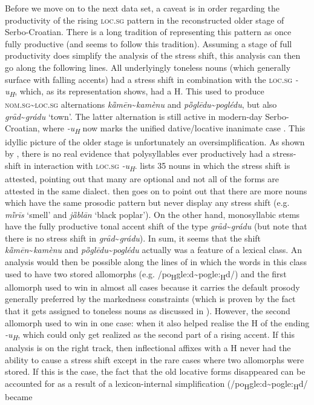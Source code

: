 \documentclass[output=paper,modfonts,nonflat
]{langsci/langscibook}
\begin{document}
Before we move on to the next data set, a caveat is in order regarding the productivity of the rising \textsc{loc}.\textsc{sg} pattern in the reconstructed older stage of Serbo-Croatian. There is a long tradition of representing this pattern as once fully productive (and \citeauthor{Klaic2013} seems to follow this tradition). Assuming a stage of full productivity does simplify the analysis of the stress shift, this analysis can then go along the following lines. All underlyingly toneless nouns (which generally surface with falling accents) had a stress shift in combination with the \textsc{loc}.\textsc{sg} \textit{-u\textsubscript{H}}, which, as its representation shows, had a H. This used to produce \textsc{nom}.\textsc{sg}\textasciitilde{}\textsc{loc}.\textsc{sg} alternations \textit{kȁmēn}\textasciitilde{}\textit{kamènu} and \textit{pȍglēdu}\textasciitilde{}\textit{poglédu}, but also \textit{grȃd}\textasciitilde{}\textit{grád}\textit{u} `town'. The latter alternation is still active in modern-day Serbo-Croatian, where \textit{-u\textsubscript{H}} now marks the unified dative/locative inanimate case \citep{SimonovicArsenijevic2015a}. This idyllic picture of the older stage is unfortunately an oversimplification. As shown by \citet[219--220]{Stevanovic1979}, there is no real evidence that polysyllables ever productively had a stress-shift in interaction with \textsc{loc}.\textsc{sg} \textit{-u\textsubscript{H}}. \citeauthor{Stevanovic1979} lists 35 nouns in which the stress shift is attested, pointing out that many are optional and not all of the forms are attested in the same dialect. \citeauthor{Stevanovic1979} then goes on to point out that there are more nouns which have the same prosodic pattern but never display any stress shift (e.g. \textit{mȉrīs} `smell' and \textit{jȁblān} `black poplar’). On the other hand, monosyllabic stems have the fully productive tonal accent shift of the type \textit{grȃd}\textasciitilde{}\textit{grádu} (but note that there is no stress shift in \textit{grȃd}\textasciitilde{}\textit{grádu}). In sum, it seems that the shift \textit{kȁmēn}\textasciitilde{}\textit{kamènu} and \textit{pȍglēdu}\textasciitilde{}\textit{poglédu} actually was a feature of a lexical class. An analysis would then be possible along the lines of \citet{Kager2008} in which the words in this class used to have two stored allomorphs (e.g. /po\textsubscript{H}gle:d\textasciitilde{}pogle:\textsubscript{H}d/) and the first allomorph used to win in almost all cases because it carries the default prosody generally preferred by the markedness constraints (which is proven by the fact that it gets assigned to toneless nouns as discussed in ). However, the second allomorph used to win in one case: when it also helped realise the H of the ending \textit{-u\textsubscript{H}}, which could only get realized as the second part of a rising accent. If this analysis is on the right track, then inflectional affixes with a H never had the ability to cause a stress shift except in the rare cases where two allomorphs were stored. If this is the case, the fact that the old locative forms disappeared can be accounted for as a result of a lexicon-internal simplification (/po\textsubscript{H}gle:d\textasciitilde{}pogle:\textsubscript{H}d/ became 
\end{document}
